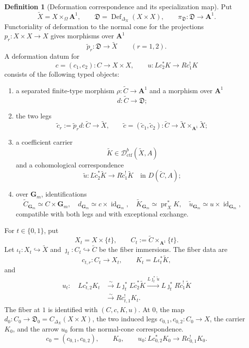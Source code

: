 \documentclass[10pt]{article}
\theoremstyle{definition}
\newtheorem{definition}[theorem]{Definition}
\newcommand{\Dctf}{\mathcal D^b_{\mathrm{ctf}}}
\begin{document}
\begin{definition}[Deformation correspondence and its specialization map]
Put
\[
 \widetilde X=X\times_\Omega\mathbf A^1,
 \qquad
 \mathfrak D=\operatorname{Def}_{\Delta_X}(X\times X),
 \qquad
 \pi_{\mathfrak D}:\mathfrak D\to\mathbf A^1.
\]
Functoriality of deformation to the normal cone for the projections
\(p_r:X\times X\to X\) gives morphisms over \(\mathbf A^1\)
\[
 \widetilde p_r:\mathfrak D\longrightarrow\widetilde X
 \qquad(r=1,2).
\]
A deformation datum for
\[
 c=(c_1,c_2):C\longrightarrow X\times X,
 \qquad
 u:Lc_2^*K\longrightarrow Rc_1^!K
\]
consists of the following typed objects:
\begin{enumerate}[label=\textup{(\alph*)}]
\item a separated finite-type morphism
\(\rho:\widetilde C\to\mathbf A^1\) and a morphism over
\(\mathbf A^1\)
\[
 d:\widetilde C\longrightarrow\mathfrak D;
\]
\item the two legs
\[
 \widetilde c_r:=\widetilde p_r d:\widetilde C\longrightarrow\widetilde X,
 \qquad
 \widetilde c=(\widetilde c_1,\widetilde c_2):
 \widetilde C\longrightarrow
 \widetilde X\times_{\mathbf A^1}\widetilde X;
\]
\item a coefficient carrier
\[
 \widetilde K\in\Dctf(\widetilde X,A)
\]
and a cohomological correspondence
\[
 \widetilde u:L\widetilde c_2^*\widetilde K
 \longrightarrow R\widetilde c_1^!\widetilde K
 \quad\text{in }D(\widetilde C,A);
\]
\item over \(\mathbf G_m\), identifications
\[
 \widetilde C_{\mathbf G_m}\simeq C\times\mathbf G_m,
 \quad d_{\mathbf G_m}\simeq c\times\operatorname{id}_{\mathbf G_m},
 \quad \widetilde K_{\mathbf G_m}\simeq
 \operatorname{pr}_X^*K,
 \quad \widetilde u_{\mathbf G_m}\simeq
 u\times\operatorname{id}_{\mathbf G_m},
\]
compatible with both legs and with exceptional exchange.
\end{enumerate}

For \(t\in\{0,1\}\), put
\[
 X_t=X\times\{t\},\qquad
 C_t:=\widetilde C\times_{\mathbf A^1}\{t\}.
\]
Let \(\iota_t:X_t\hookrightarrow\widetilde X\) and
\(\jmath_t:C_t\hookrightarrow\widetilde C\) be the fiber immersions.  The
fiber data are
\[
 c_{t,r}:C_t\longrightarrow X_t,
 \qquad
 K_t=L\iota_t^*\widetilde K,
\]
and
\[
\begin{aligned}
 u_t:\quad Lc_{t,2}^*K_t
 &\xrightarrow{\sim}L\jmath_t^*L\widetilde c_2^*\widetilde K
 \xrightarrow{L\jmath_t^*\widetilde u}
 L\jmath_t^*R\widetilde c_1^!\widetilde K\\
 &\xrightarrow{\sim}Rc_{t,1}^!K_t.
\end{aligned}
\]
The fiber at \(1\) is identified with \((C,c,K,u)\).  At \(0\), the map
\(d_0:C_0\to\mathfrak D_0=C_{\Delta_X}(X\times X)\), the two induced
legs \(c_{0,1},c_{0,2}:C_0\to X\), the carrier \(K_0\), and the arrow
\(u_0\) form the normal-cone correspondence.
\iffalse
\[
 c_0=(c_{0,1},c_{0,2}),\qquad K_0,\qquad
 u_0:Lc_{0,2}^*K_0\longrightarrow Rc_{0,1}^!K_0.
\]


\end{definition}
\end{document}
